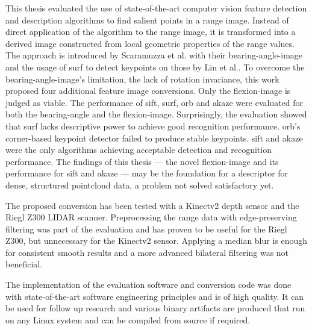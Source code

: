 This thesis evaluated the use of state-of-the-art computer vision feature detection and description algorithms to find salient points in a range image.
Instead of direct application of the algorithm to the range image, it is transformed into a derived image constructed from local geometric properties of the range values.
The approach is introduced by Scaramuzza et al.\cite{scaramuzza_iros2007} with their \gls{bearing-angle-image} and the usage of \acrshort{surf} to detect keypoints on those by Lin et al.\cite{lin_easp2017}.
To overcome the \gls{bearing-angle-image}'s limitation, the lack of rotation invariance, this work proposed four additional feature image conversions.
Only the \gls{flexion-image} is judged as viable.
The performance of \acrshort{sift}, \acrshort{surf}, \acrshort{orb} and \acrshort{akaze} were evaluated for both the \gls{bearing-angle} and the \gls{flexion-image}.
Surprisingly, the evaluation showed that \acrshort{surf} lacks descriptive power to achieve good recognition performance.
\acrshort{orb}'s corner-based keypoint detector failed to produce stable keypoints.
\acrshort{sift} and \acrshort{akaze} were the only algorithms achieving acceptable detection and recognition performance.
The findings of this thesis --- the novel \gls{flexion-image} and its performance for \acrshort{sift} and \acrshort{akaze} --- may be the foundation for a descriptor for dense, structured pointcloud data, a problem not solved satisfactory yet.

The proposed conversion has been tested with a Kinectv2 depth sensor and the Riegl Z300 \acrshort{LIDAR} scanner.
Preprocessing the range data with edge-preserving filtering was part of the evaluation and has proven to be useful for the Riegl Z300, but unnecessary for the Kinectv2 sensor.
Applying a median blur is enough for consistent smooth results and a more advanced bilateral filtering was not beneficial.

The implementation of the evaluation software and conversion code was done with state-of-the-art software engineering principles and is of high quality.
It can be used for follow up research and various binary artifacts are produced that run on any Linux system and can be compiled from source if required.
